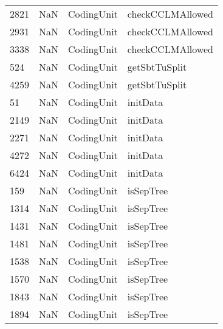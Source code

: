 \begin{tabular}{llll}
2821 &                   NaN &                 CodingUnit &                          checkCCLMAllowed \\
2931 &                   NaN &                 CodingUnit &                          checkCCLMAllowed \\
3338 &                   NaN &                 CodingUnit &                          checkCCLMAllowed \\
524  &                   NaN &                 CodingUnit &                             getSbtTuSplit \\
4259 &                   NaN &                 CodingUnit &                             getSbtTuSplit \\
51   &                   NaN &                 CodingUnit &                                  initData \\
2149 &                   NaN &                 CodingUnit &                                  initData \\
2271 &                   NaN &                 CodingUnit &                                  initData \\
4272 &                   NaN &                 CodingUnit &                                  initData \\
6424 &                   NaN &                 CodingUnit &                                  initData \\
159  &                   NaN &                 CodingUnit &                                 isSepTree \\
1314 &                   NaN &                 CodingUnit &                                 isSepTree \\
1431 &                   NaN &                 CodingUnit &                                 isSepTree \\
1481 &                   NaN &                 CodingUnit &                                 isSepTree \\
1538 &                   NaN &                 CodingUnit &                                 isSepTree \\
1570 &                   NaN &                 CodingUnit &                                 isSepTree \\
1843 &                   NaN &                 CodingUnit &                                 isSepTree \\
1894 &                   NaN &                 CodingUnit &                                 isSepTree \\

\end{tabular}
